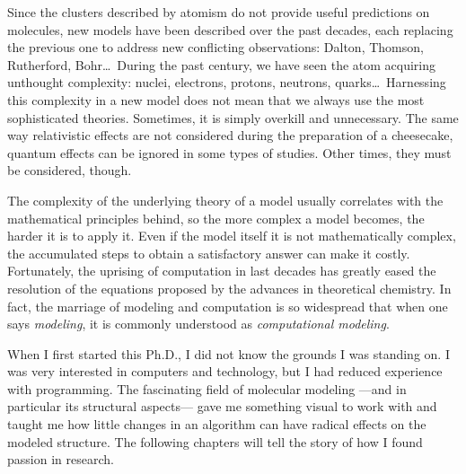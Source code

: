Since the clusters described by atomism do not provide useful predictions on molecules, new models have been described over the past decades, each replacing the previous one to address new conflicting observations: Dalton, Thomson, Rutherford, Bohr\ldots\ During the past century, we have seen the atom acquiring unthought complexity: nuclei, electrons, protons, neutrons, quarks\ldots\  Harnessing this complexity in a new model does not mean that we always use the most sophisticated theories. Sometimes, it is simply overkill and unnecessary. The same way relativistic effects are not considered during the preparation of a cheesecake, quantum effects can be ignored in some types of studies. Other times, they must be considered, though.

The complexity of the underlying theory of a model usually correlates with the mathematical principles behind, so the more complex a model becomes, the harder it is to apply it. Even if the model itself it is not mathematically complex, the accumulated steps to obtain a satisfactory answer can make it costly. Fortunately, the uprising of computation in last decades has greatly eased the resolution of the equations proposed by the advances in theoretical chemistry. In fact, the marriage of modeling and computation is so widespread that when one says \textit{modeling}, it is commonly understood as \textit{computational modeling}.


When I first started this Ph.D., I did not know the grounds I was standing on. I was very interested in computers and technology, but I had reduced experience with programming. The fascinating field of molecular modeling ---and in particular its structural aspects--- gave me something visual to work with and taught me how little changes in an algorithm can have radical effects on the modeled structure. The following chapters will tell the story of how I found passion in research.